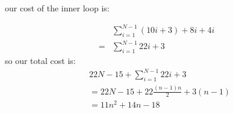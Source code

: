\documentclass{article}
\begin{document}
our cost of the inner loop is:

\begin{align*}
&\sum_{i=1}^{N-1} (10i + 3) + 8i + 4i\\
=&\sum_{i=1}^{N-1} 22i + 3
\end{align*}
so our total cost is:
\begin{align*}
& 22N - 15 + \sum_{i=1}^{N-1} 22i + 3\\
&= 22N - 15 + 22\frac{(n-1)n}{2} + 3 (n-1)\\
&= 11n^2 + 14n - 18
\end{align*}
\end{document}

